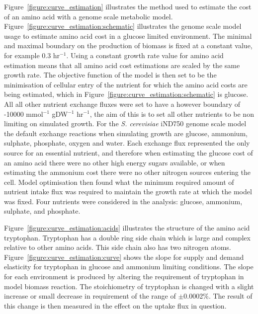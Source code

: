 Figure~\vref{figure:curve_estimation} illustrates the method used to estimate the cost of an amino acid with a genome scale metabolic model. Figure~\ref{figure:curve_estimation:schematic} illustrates the genome scale model usage to estimate amino acid cost in a glucose limited environment. The minimal and maximal boundary on the production of biomass is fixed at a constant value, for example 0.3 hr$^{-1}$. Using a constant growth rate value for amino acid estimation means that all amino acid cost estimations are scaled by the same growth rate. The objective function of the model is then set to be the minimisation of cellular entry of the nutrient for which the amino acid costs are being estimated, which in Figure~\ref{figure:curve_estimation:schematic} is glucose. All all other nutrient exchange fluxes were set to have a however boundary of -10000 mmol$^{-1}$ gDW$^{-1}$ hr$^{-1}$, the aim of this is to set all other nutrients to be non limiting on simulated growth. For the \emph{S. cerevisiae} iND750 \cite{duarte2004a} genome scale model the default exchange reactions when simulating growth are glucose, ammonium, sulphate, phosphate, oxygen and water. Each exchange flux represented the only source for an essential nutrient, and therefore when estimating the glucose cost of an amino acid there were no other high energy sugars available, or when estimating the ammonium cost there were no other nitrogen sources entering the cell. Model optimisation then found what the minimum required amount of nutrient intake flux was required to maintain the growth rate at which the model was fixed. Four nutrients were considered in the analysis: glucose, ammonium, sulphate, and phosphate. 

Figure~\ref{figure:curve_estimation:acids} illustrates the structure of the amino acid tryptophan. Tryptophan has a double ring side chain which is large and complex relative to other amino acids. This side chain also has two nitrogen atoms. Figure~\ref{figure:curve_estimation:curve} shows the slope for supply and demand elasticity for tryptophan in glucose and ammonium limiting conditions. The slope for each environment is produced by altering the requirement of tryptophan in model biomass reaction. The stoichiometry of tryptophan is changed with a slight increase or small decrease in requirement of the range of $\pm$0.0002\%. The result of this change is then measured in the effect on the uptake flux in question. 

